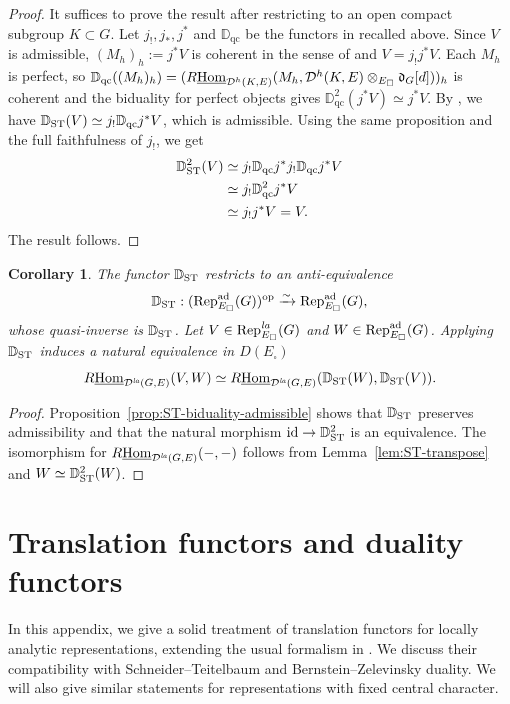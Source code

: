 \documentclass[a4paper,10pt]{amsart}
\theoremstyle{remark}
\theoremstyle{definition}
\theoremstyle{plain}
\newtheorem{corollary}[theorem]{Corollary}
\numberwithin{equation}{section}
\newcommand{\bbD}{{\mathbb D}}
\newcommand{\calD}{{\mathcal D}}
\newcommand{\Hom}{{\rm Hom}}
\newcommand{\uHom}{\underline{\Hom}}
\newcommand{\la}{{\it la}}
\newcommand{\Rep}{{\rm Rep}}
\newcommand{\ST}{{\rm ST}}
\begin{document}
\begin{proof}
It suffices to prove the result after restricting to an open compact subgroup $K\subset G$. Let $j_!,j_*,j^*$ and $\bbD_{\mathrm{qc}}$ be the functors in \cite[\S~4]{JC23} recalled above. Since $V$ is admissible, $(M_h)_h:=j^*V$ is coherent in the sense of \cite[Def.~4.2.1]{JC23} and $V=j_!j^*V$. Each $M_h$ is perfect, so $\bbD_{\mathrm{qc}}((M_h)_h)=(R\uHom_{\calD^h(K,E)}(M_h,\calD^h(K,E)\otimes_{E_{\square}}\mathfrak{d}_G[d]))_h$ is coherent and the biduality for perfect objects gives $\bbD_{\mathrm{qc}}^2(j^*V)\simeq j^*V$. By \cite[Prop.~4.2.7]{JC23}, we have $\bbD_{\ST}(V)\simeq j_!\bbD_{\mathrm{qc}}j^*V$, which is admissible. Using the same proposition and the full faithfulness of $j_!$, we get
\begin{align*}
 \bbD_{\ST}^2(V)
 &\simeq j_!\bbD_{\mathrm{qc}}j^*j_!\bbD_{\mathrm{qc}}j^*V\\
 &\simeq j_!\bbD_{\mathrm{qc}}^2j^*V\\
 &\simeq j_!j^*V=V.
\end{align*}
The result follows.
\end{proof}

\begin{corollary}
The functor $\bbD_{\ST}$ restricts to an anti-equivalence
\[
 \bbD_{\ST}:(\Rep^{\mathrm{ad}}_{E_\square}(G))^{\mathrm{op}}
 \xrightarrow{\sim}
 \Rep^{\mathrm{ad}}_{E_\square}(G),
\]
whose quasi-inverse is $\bbD_{\ST}$. Let $V\in\Rep^{\la}_{E_\square}(G)$ and $W\in\Rep^{\mathrm{ad}}_{E_\square}(G)$.  Applying $\bbD_{\ST}$ induces a natural equivalence in $D(E_\square)$
\[
 R\underline{\mathrm{Hom}}_{\calD^{\la}(G,E)}(V,W)
 \simeq
 R\underline{\mathrm{Hom}}_{\calD^{\la}(G,E)}
 (\bbD_{\ST}(W),\bbD_{\ST}(V)).
\]
\end{corollary}

\begin{proof}
Proposition~\ref{prop:ST-biduality-admissible} shows that $\bbD_{\ST}$ preserves admissibility and that the natural morphism $\mathrm{id}\to\bbD_{\ST}^2$ is an equivalence. The isomorphism for $R\uHom_{\calD^{\la}(G,E)}(-,-)$ follows from Lemma~\ref{lem:ST-transpose} and $W\simeq \bbD_{\ST}^2(W)$.
\end{proof}

\section{Translation functors and duality functors}\label{sec:translation-duality}
In this appendix, we give a solid treatment of translation functors for locally analytic representations, extending the usual formalism in \cite{jena2021translation}. We discuss their compatibility with Schneider--Teitelbaum and Bernstein--Zelevinsky duality. We will also give similar statements for representations with fixed central character.
\end{document}
